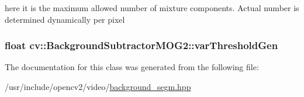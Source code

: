 here it is the maximum allowed number of mixture components. Actual number is determined dynamically per pixel \hypertarget{classcv_1_1BackgroundSubtractorMOG2_a7989b0787eb340a8e9bac7f5dd42f6a7}{
\subsubsection[{var\-Threshold\-Gen}]{\setlength{\rightskip}{0pt plus 5cm}float cv\-::\-Background\-Subtractor\-M\-O\-G2\-::var\-Threshold\-Gen\hspace{0.3cm}{\ttfamily [protected]}}}\label{classcv_1_1BackgroundSubtractorMOG2_a7989b0787eb340a8e9bac7f5dd42f6a7}


The documentation for this class was generated from the following file\-:\begin{DoxyCompactItemize}
\item 
/usr/include/opencv2/video/\hyperlink{background__segm_8hpp}{background\-\_\-segm.\-hpp}\end{DoxyCompactItemize}
